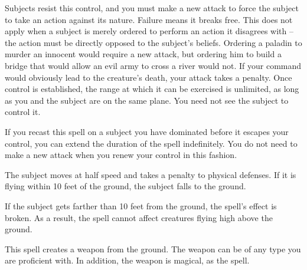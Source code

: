 \begin{spelleffect}
  \par Subjects resist this control, and you must make a new attack to force the subject to take an action against its nature. Failure means it breaks free. This does not apply when a subject is merely ordered to perform an action it disagrees with -- the action must be directly opposed to the subject's beliefs. Ordering a paladin to murder an innocent would require a new attack, but ordering him to build a bridge that would allow an evil army to cross a river would not. If your command would obviously lead to the creature's death, your attack takes a  penalty. Once control is established, the range at which it can be exercised is unlimited, as long as you and the subject are on the same plane. You need not see the subject to control it.
  \par If you recast this spell on a subject you have dominated before it escapes your control, you can extend the duration of the spell indefinitely. You do not need to make a new attack when you renew your control in this fashion.
\end{spelleffect}

\begin{comment}
\subsubsection{E}
\end{comment}

\spellrng{\rngmed}
\spelldur{\durshort}
\begin{spelleffect}
  The subject moves at half speed and takes a  penalty to physical defenses. If it is flying within 10 feet of the ground, the subject falls to the ground.
\end{spelleffect}
\begin{spellnotes}
  If the subject gets farther than 10 feet from the ground, the spell's effect is broken. As a result, the spell cannot affect creatures flying high above the ground.
\end{spellnotes}

\begin{spelleffect}
    This spell creates a weapon from the ground. The weapon can be of any type you are proficient with. In addition, the weapon is magical, as the  spell.
\end{spelleffect}

